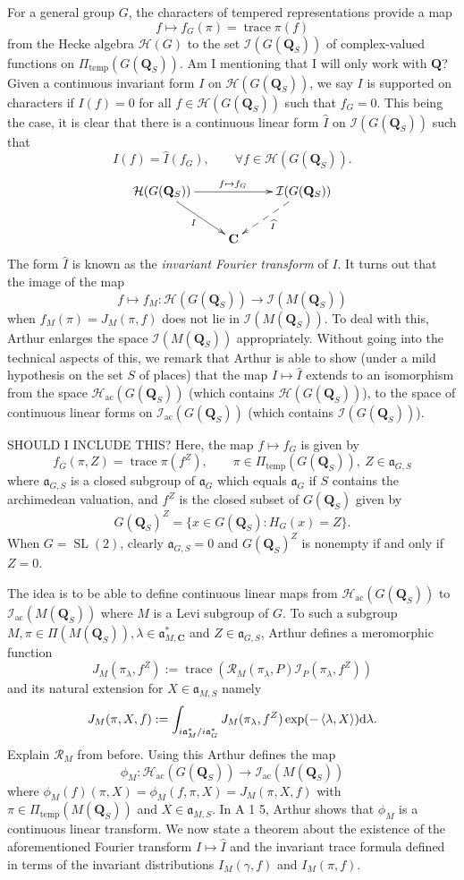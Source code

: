 \documentclass[11pt]{amsart}
\def\C{\mathbf C}
\def\Q{\mathbf Q}
\def\HHH{\mathcal H}
\def\III{\mathcal I}
\def\aaa{\mathfrak a}
\def\d{\text d}
\def\RRR{\mathcal R}
\def\sl{\operatorname{SL}}
\def\sprod#1#2{\left\langle #1 , #2 \right\rangle}  %
\def\trace{\operatorname{trace}}
\theoremstyle{remark}
\begin{document}
For a general group $G$, the characters of tempered representations provide a map
\[ f \mapsto f_G(\pi) = \trace \pi(f) \]
from the Hecke algebra $\HHH(G)$ to the set $\III(G(\Q_S))$ of complex-valued functions on $\Pi_{\text{temp}}(G(\Q_S))$. {\color{red}Am I mentioning that I will only work with $\Q$?} Given a continuous invariant form $I$ on $\HHH(G(\Q_S))$, we say $I$ is supported on characters if $I(f) = 0$ for all $f \in \HHH(G(\Q_S))$ such that $f_G = 0$. This being the case, it is clear that there is a continuous linear form $\widehat I$ on $\III(G(\Q_S))$ such that 
\[ I(f) = \widehat I(f_G), \qquad \forall f \in \HHH(G(\Q_S)). \]
\[ \xymatrix{ \HHH(G(\Q_S)) \ar[rr]^{f \mapsto f_G} \ar[dr]_I && \III(G(\Q_S)) \ar@{-->}[dl]^{\widehat I} \\ & \C & }
\]
The form $\widehat I$ is known as the \textit{invariant Fourier transform} of $I$. It turns out that the image of the map
\[ f \mapsto f_M : \HHH(G(\Q_S)) \to \III(M(\Q_S)) \]
when $f_M(\pi) = J_M(\pi, f)$ does not lie in $\III(M(\Q_S))$. To deal with this, Arthur enlarges the space $\III(M(\Q_S))$ appropriately. Without going into the technical aspects of this, we remark that Arthur is able to show (under a mild hypothesis on the set $S$ of places) that the map $I \mapsto \widehat I$ extends to an isomorphism from the space $\HHH_{\text{ac}}(G(\Q_S))$ (which contains $\HHH(G(\Q_S))$), to the space of continuous linear forms on $\III_{\text{ac}}(G(\Q_S))$ (which contains $\III(G(\Q_S))$).

{\color{red} SHOULD I INCLUDE THIS? Here, the map $f \mapsto f_G$ is given by
\[ f_G(\pi, Z) = \trace \pi(f^Z), \qquad \pi \in \Pi_{\text{temp}}(G(\Q_S)), \ Z \in \aaa_{G, S} \]
where $\aaa_{G, S}$ is a closed subgroup of $\aaa_G$ which equals $\aaa_G$ if $S$ contains the archimedean valuation, and $f^Z$ is the closed subset of $G(\Q_S)$ given by
\[ G(\Q_S)^Z = \{ x \in G(\Q_S) : H_G(x) = Z \}. \]
When $G = \sl(2)$, clearly $\aaa_{G, S} = 0$ and $G(\Q_S)^Z$ is nonempty if and only if $Z = 0$. 
}

The idea is to be able to define continuous linear maps from $\HHH_{\text{ac}}(G(\Q_S))$ to $\III_{\text{ac}}(M(\Q_S))$ where $M$ is a Levi subgroup of $G$. To such a subgroup $M, \pi \in \Pi(M(\Q_S)), \lambda \in \aaa_{M, \C}^*$ and $Z \in \aaa_{G, S}$, Arthur defines a meromorphic function
\[ J_M(\pi_\lambda, f^Z) := \trace \left( \RRR_M(\pi_\lambda, P) \III_P(\pi_\lambda, f^Z) \right) \]
and its natural extension for $X \in \aaa_{M, S}$ namely
\[ J_M(\pi, X, f) := \int_{i\aaa_M^* / i\aaa_G^*} J_M(\pi_\lambda, f^Z) \exp(-\sprod{\lambda}{X}) \d \lambda. \]
{\color{red} Explain $\RRR_M$ from before.} 
Using this Arthur defines the map
\[ \phi_M : \HHH_{\text{ac}}(G(\Q_S)) \to \III_{\text{ac}}(M(\Q_S)) \]
where $\phi_M(f)(\pi, X) = \phi_M(f, \pi, X) = J_M(\pi, X, f)$ with $\pi \in \Pi_{\text{temp}}(M(\Q_S))$ and $X \in \aaa_{M, S}$. In {\color{red} A 1 5}, Arthur shows that $\phi_M$ is a continuous linear transform. We now state a theorem about the existence of the aforementioned Fourier transform $I \mapsto \widehat I$ and the invariant trace formula defined in terms of the invariant distributions $I_M(\gamma, f)$ and $I_M(\pi, f)$. 
\end{document}
